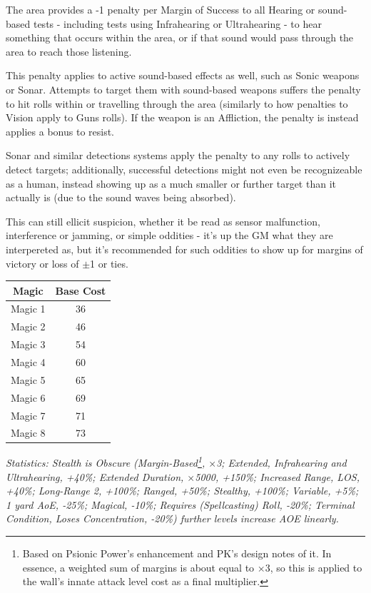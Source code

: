 \begin{multicols*}{3}
	The area provides a -1 penalty per Margin of Success to all Hearing or sound-based tests - including tests using Infrahearing or Ultrahearing - to hear something that occurs within the area, or if that sound would pass through the area to reach those listening.
	
	This penalty applies to active sound-based effects as well, such as Sonic weapons or Sonar. Attempts to target them with sound-based weapons suffers the penalty to hit rolls within or travelling through the area (similarly to how penalties to Vision apply to Guns rolls). If the weapon is an Affliction, the penalty is instead applies a bonus to resist.
	
	Sonar and similar detections systems apply the penalty to any rolls to actively detect targets; additionally, successful detections might not even be recognizeable as a human, instead showing up as a much smaller or further target than it actually is (due to the sound waves being absorbed). 
	
	This can still ellicit suspicion, whether it be read as sensor malfunction, interference or jamming, or simple oddities - it's up the GM what they are interpereted as, but it's recommended for such oddities to show up for margins of victory or loss of $\pm$1 or ties.
	
	\begin{center}
		\begin{tabular}{|c|c|}
			\hline
			Magic & Base Cost \\
			\hline
			\hline
			Magic 1 & 36 \\
			Magic 2 & 46 \\
			Magic 3 & 54 \\
			Magic 4 & 60 \\
			Magic 5 & 65 \\
			Magic 6 & 69 \\
			Magic 7 & 71 \\
			Magic 8 & 73 \\
			\hline
		\end{tabular}
	\end{center}
	
	\textcolor{OliveGreen}{\textit{Statistics: Stealth is Obscure (Margin-Based\footnote{Based on Psionic Power’s enhancement and PK’s design notes of it. In essence, a weighted sum of margins is about equal to ×3, so this is applied to the wall’s innate attack level cost as a final multiplier.}, $\times$3; Extended, Infrahearing and Ultrahearing, +40\%; Extended Duration, $\times$5000, +150\%; Increased Range, LOS, +40\%; Long-Range 2, +100\%; Ranged, +50\%; Stealthy, +100\%; Variable, +5\%; 1 yard AoE, -25\%; Magical, -10\%; Requires (Spellcasting) Roll, -20\%; Terminal Condition, Loses Concentration, -20\%) further levels increase AOE linearly.}}
	

\end{multicols*}
